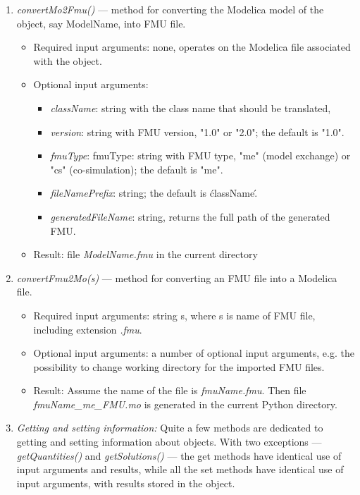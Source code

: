 \begin{enumerate}
	\item \textit{convertMo2Fmu()} — method for converting the Modelica model of the object, say ModelName, into FMU file.
	\begin{itemize}
		\item Required input arguments: none, operates on the Modelica file associated with the object.
		\item Optional input arguments:
		\begin{itemize}
			\item \textit{className}: string with the class name that should be translated,
			\item \textit{version}: string with FMU version, "1.0" or "2.0"; the default is "1.0".
			\item \textit{fmuType}: fmuType: string with FMU type, "me" (model exchange) or "cs" (co-simulation); the default is "me".
			\item \textit{fileNamePrefix}: string; the default is \'className\'.
			\item \textit{generatedFileName}: string, returns the full path of the generated FMU.
		\end{itemize}
		\item Result: file \textit{ModelName.fmu} in the current directory
	\end{itemize}
	\item \textit{convertFmu2Mo(s)} — method for converting an FMU file into a Modelica file.
	\begin{itemize}
		\item Required input arguments: string s, where s is name of FMU file, including extension \textit{.fmu}.
        \item Optional input arguments: a number of optional input arguments, e.g. the possibility to change working directory for the imported FMU files.
        \item Result: Assume the name of the file is \textit{fmuName.fmu}. Then file \textit{fmuName\_me\_FMU.mo} is generated in the current Python  
        	  directory.
	\end{itemize}
	\item \textit{Getting and setting information:} Quite a few methods are dedicated to getting and setting information about
	objects. With two exceptions — \textit{getQuantities()} and \textit{getSolutions()} — the get methods have identical use of input arguments and results, while all the set methods have identical use of input arguments, with results	stored in the object.
	

\end{enumerate}
